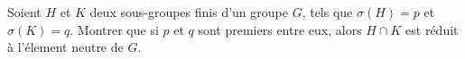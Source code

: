 Soient $H$ et $K$ deux sous-groupes finis d'un groupe $G$, tels que $\sigma(H)=p$ et $\sigma(K)=q$. Montrer que si $p$ et $q$ sont premiers entre eux, alors $H \cap K$ est réduit à l'élement neutre de $G$.